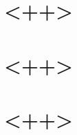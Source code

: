 \documentclass[UTF8]{ctexart}
\title{\heiti <++>}
\author{\kaishu 浙江理工大学 2010届数学与应用数学（2）班 葛逸盛}
\begin{document}
\maketitle

\begin{abstract}
  <++>
\end{abstract}

\tableofcontents

\section{<++>}

\section{<++>}

\section{<++>}


\end{document}
